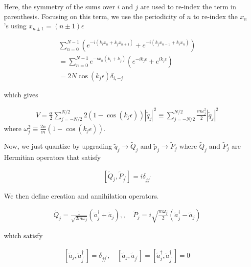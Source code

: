 \documentclass[pre,floatfix,onecolumn]{revtex4-2}
\begin{document}
Here, the symmetry of the sums over $i$ and $j$ are used to re-index the term in parenthesis. Focusing on this term, we use the periodicity of $n$ to re-index the $x_{n}$ 's using $x_{n \pm 1}=(n \pm 1) \epsilon$

\begin{equation}
    \begin{gathered}
        \sum_{n=0}^{N-1}\left(e^{-i\left(k_{i} x_{n}+k_{j} x_{n+1}\right)}+e^{-i\left(k_{j} x_{n-1}+k_{i} x_{n}\right)}\right) \\
= \sum_{n=0}^{N-1} e^{-i x_{n}\left(k_{i}+k_{j}\right)}\left(e^{-i k_{j} \epsilon}+e^{i k_{j} \epsilon}\right) \\
= 2 N \cos \left(k_{j} \epsilon\right) \delta_{i,-j}
    \end{gathered}
\end{equation}

which gives

\begin{align}
V = \frac{\alpha}{2} \sum_{j=-N / 2}^{N / 2} 2\left(1-\cos \left(k_{j} \epsilon\right)\right)\left|\tilde{q}_{j}\right|^{2} \equiv \sum_{j=-N / 2}^{N / 2} \frac{m \omega_{j}^{2}}{2}\left|\tilde{q}_{j}\right|^{2} 
\end{align}
where \(\omega_{j}^{2} \equiv \frac{2 \alpha}{m}\left(1-\cos \left(k_{j} \epsilon\right)\right)\).


Now, we just quantize by upgrading $\tilde{q}_{j} \rightarrow \tilde{Q}_{j}$ and $\tilde{p}_{j} \rightarrow \tilde{P}_{j}$ where $\tilde{Q}_{j}$ and $\tilde{P}_{j}$ are Hermitian operators that satisfy

\begin{align}
\left[\tilde{Q}_{j}, \tilde{P}_{j^{\prime}}\right]=i \delta_{j j^{\prime}}
\end{align}

We then define creation and annihilation operators.

\begin{align}
\tilde{Q}_{j} = \frac{1}{\sqrt{2 m \omega_{j}}}\left(\tilde{a}_{j}^{\dagger}+\tilde{a}_{j}\right), , \quad \tilde{P}_{j} = i \sqrt{\frac{m \omega_{j}}{2}}\left(\tilde{a}_{j}^{\dagger}-\tilde{a}_{j}\right)
\end{align}

which satisfy

\begin{align}
\left[\tilde{a}_{j}, \tilde{a}_{j^{\prime}}^{\dagger}\right] = \delta_{j j^{\prime}}, \quad\left[\tilde{a}_{j}, \tilde{a}_{j^{\prime}}\right] = \left[\tilde{a}_{j}^{\dagger}, \tilde{a}_{j^{\prime}}^{\dagger}\right]=0
\end{align}
\end{document}

